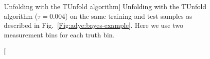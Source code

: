 \documentclass{cernrep}
\begin{document}
\begin{figure}
%
\caption
[Unfolding with the TUnfold algorithm]%
{Unfolding with the TUnfold algorithm ($\tau=0.004$) on the same training and test
samples as described in Fig.~\ref{Fig:adye:bayes-example}.
Here we use two measurement bins for each truth bin.}%
\label{Fig:adye:tunfold-example}
\end{figure}
\end{document}

